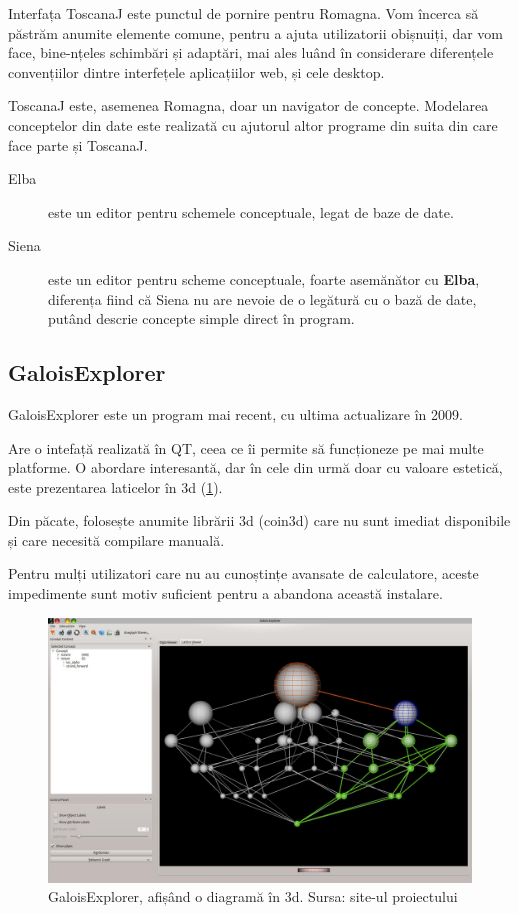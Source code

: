 \documentclass[12pt, a4paper, twoside, romanian]{teza-upb}
\begin{document}
        Interfața ToscanaJ este punctul de pornire pentru Romagna. Vom încerca să păstrăm anumite elemente comune, pentru a ajuta utilizatorii obișnuiți, dar vom face, bine-nțeles schimbări și adaptări, mai ales luând în considerare diferențele convențiilor dintre interfețele aplicațiilor web, și cele desktop.

        ToscanaJ este, asemenea Romagna, doar un navigator de concepte. Modelarea conceptelor din date este realizată cu ajutorul altor programe din suita din care face parte și ToscanaJ.

        \begin{description}
            \item[Elba] este un editor pentru schemele conceptuale, legat de baze de date.
            \item[Siena] este un editor pentru scheme conceptuale, foarte asemănător cu \textbf{Elba}, diferența fiind că Siena nu are nevoie de o legătură cu o bază de date, putând descrie concepte simple direct în program.
        \end{description}

  \subsection{GaloisExplorer}
    GaloisExplorer \cite{GaloisExplorer:homepage} este un program mai recent, cu ultima actualizare în 2009.

    Are o intefață realizată în QT, ceea ce îi permite să funcționeze pe mai multe platforme. O abordare interesantă, dar în cele din urmă doar cu valoare estetică, este prezentarea laticelor în 3d (\ref{screenshot:galoisexplorer}).
   
    Din păcate, folosește anumite librării 3d (coin3d\cite{Coin:homepage}) care nu sunt imediat disponibile și care necesită compilare manuală.

    Pentru mulți utilizatori care nu au cunoștințe avansate de calculatore, aceste impedimente sunt motiv suficient pentru a abandona această instalare.
    \begin{figure}[h]
      \centering
      \includegraphics[width=\textwidth]{GaloisExplorer_latticeView}
      \caption{GaloisExplorer, afișând o diagramă în 3d. Sursa: site-ul proiectului \cite{GaloisExplorer:sourceforge}}
      \label{screenshot:galoisexplorer}
    \end{figure}
\end{document}
